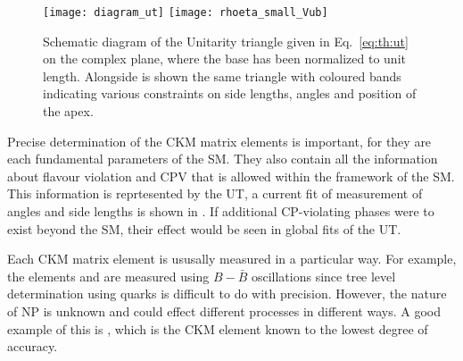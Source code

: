 \begin{figure}
  \begin{center}
      \texttt{[image: diagram\_ut]}
      \texttt{[image: rhoeta\_small\_Vub]}
  \end{center}
  \caption[Unitarity triangle]{\small
    Schematic diagram of the Unitarity triangle given in Eq.~\ref{eq:th:ut} on the complex plane,
    where the base has been normalized to unit length.
    Alongside is shown the same triangle with coloured bands indicating various constraints on
    side lengths, angles and position of the apex.
  }
  \label{fig:th:ut}
\end{figure}

Precise determination of the CKM matrix elements is important, for  they are each fundamental
parameters of the SM.
They also contain all the information about flavour violation and CPV that is allowed within the
framework of the SM.
This information is reprtesented by the UT, a current fit of measurement of angles and side lengths
is shown in .
If additional CP-violating phases were to exist beyond the SM, their effect would be seen in global
fits of the UT.

Each CKM matrix element is ususally measured in a particular way.
For example, the elements  and  are measured using $B-\bar B$ oscillations since tree
level determination using \tquark quarks is difficult to do with precision.
However, the nature of NP is unknown and could effect different processes in different ways.
A good example of this is , which is the CKM element known to the lowest degree of accuracy.


